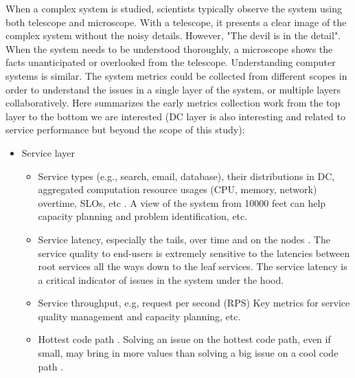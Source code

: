 When a complex system is studied, scientists typically observe the system using both telescope and microscope. With a telescope, it presents a clear image of the complex system without the noisy details. However, "The devil is in the detail". When the system needs to be understood thoroughly, a microscope shows the facts unanticipated or overlooked from the telescope. Understanding computer systems is similar. The system metrics could be collected from different scopes in order to understand the issues in a single layer of the system, or multiple layers collaboratively. Here summarizes the early metrics collection work  from the top layer to the bottom we are interested (DC layer is also interesting and related to service performance but beyond the scope of this study):
\begin{itemize}
  \item Service layer
    \begin{itemize}
      \item Service types (e.g., search, email, database), their distributions in DC, aggregated computation resource usages (CPU, memory, network) overtime, SLOs, etc \autocite{DBLP:conf/cloud/ReissTGKK12,DBLP:conf/bigdataconf/LuYXXB17}.
       A view of the system from 10000 feet can help capacity planning and problem identification, etc.

      \item Service latency, especially the tails, over time and on the nodes \autocite{DBLP:journals/cacm/DeanB13, DBLP:conf/nsdi/OusterhoutFBBB19}.
        The service quality to end-users is extremely sensitive to the latencies between root services all the ways down to the leaf services. The service latency is a critical indicator of issues in the system under the hood.

      \item Service throughput, e.g, request per second (RPS)
        Key metrics for service quality management and capacity planning, etc.

      \item Hottest code path \autocite{DBLP:journals/micro/KanevDHRMWB16, DBLP:conf/iwqos/GuoCWDFMB19}.
        Solving an issue on the hottest code path, even if small, may bring in more values than solving a big issue on a cool code path \autocite{DBLP:conf/ispass/Yasin14}.


\end{itemize}
\end{itemize}
